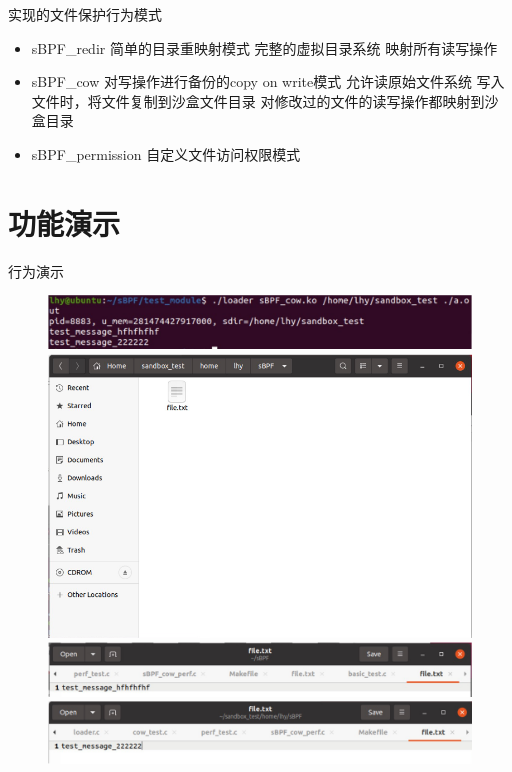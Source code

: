 \documentclass[UTF8,fontset=macnew,xcolor=table]{ctexbeamer}
\begin{document}
\begin{frame}{实现的文件保护行为模式}

    \begin{itemize}
        \item {\ttfamily sBPF\_redir} 简单的目录重映射模式 
        完整的虚拟目录系统
        映射所有读写操作
        
        \item {\ttfamily sBPF\_cow} 对写操作进行备份的copy on write模式
        允许读原始文件系统
        写入文件时，将文件复制到沙盒文件目录
        对修改过的文件的读写操作都映射到沙盒目录
        
        \item {\ttfamily sBPF\_permission} 自定义文件访问权限模式
    \end{itemize}
    
\end{frame}

\section{功能演示}
\begin{frame}{行为演示}

\begin{figure}[H]
    \centering
    \includegraphics[width=0.55\columnwidth]{pic6.png}
    \includegraphics[width=0.5\columnwidth]{pic7.png}
    \includegraphics[width=0.55\columnwidth]{pic8.png}
    \includegraphics[width=0.55\columnwidth]{pic9.png}
\end{figure}

\end{frame}
\end{document}

